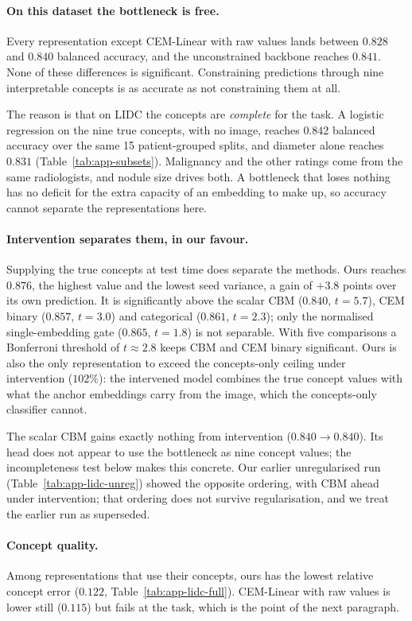 \documentclass[11pt]{article}
\begin{document}
\paragraph{On this dataset the bottleneck is free.}
Every representation except CEM-Linear with raw values lands between $0.828$
and $0.840$ balanced accuracy, and the unconstrained backbone reaches $0.841$.
None of these differences is significant. Constraining predictions through
nine interpretable concepts is as accurate as not constraining them at all.

The reason is that on LIDC the concepts are \emph{complete} for the task. A
logistic regression on the nine true concepts, with no image, reaches $0.842$
balanced accuracy over the same 15 patient-grouped splits, and diameter alone
reaches $0.831$ (Table~\ref{tab:app-subsets}). Malignancy and the other ratings
come from the same radiologists, and nodule size drives both. A bottleneck that
loses nothing has no deficit for the extra capacity of an embedding to make
up, so accuracy cannot separate the representations here.

\paragraph{Intervention separates them, in our favour.}
Supplying the true concepts at test time does separate the methods. Ours
reaches $0.876$, the highest value and the lowest seed variance, a gain of
$+3.8$ points over its own prediction. It is significantly above the scalar CBM
($0.840$, $t = 5.7$), CEM binary ($0.857$, $t = 3.0$) and categorical ($0.861$,
$t = 2.3$); only the normalised single-embedding gate ($0.865$, $t = 1.8$) is
not separable. With five comparisons a Bonferroni threshold of $t \approx 2.8$
keeps CBM and CEM binary significant. Ours is also the only representation to
exceed the concepts-only ceiling under intervention ($102\%$): the intervened
model combines the true concept values with what the anchor embeddings carry
from the image, which the concepts-only classifier cannot.

The scalar CBM gains exactly nothing from intervention ($0.840 \to 0.840$).
Its head does not appear to use the bottleneck as nine concept values; the
incompleteness test below makes this concrete. Our earlier unregularised run
(Table~\ref{tab:app-lidc-unreg}) showed the opposite ordering, with CBM ahead
under intervention; that ordering does not survive regularisation, and we treat
the earlier run as superseded.

\paragraph{Concept quality.}
Among representations that use their concepts, ours has the lowest relative
concept error ($0.122$, Table~\ref{tab:app-lidc-full}). CEM-Linear with raw
values is lower still ($0.115$) but fails at the task, which is the point of
the next paragraph.
\end{document}
